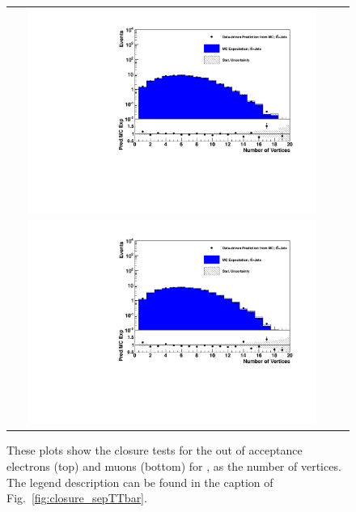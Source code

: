 \begin{figure}[tbhn]
\begin{center}
\begin{tabular}{cc}
\includegraphics[width=0.90\textwidth]{lostlepton/plots/closure/NVttbarAcce.pdf}\\
\includegraphics[width=0.90\textwidth]{lostlepton/plots/closure/NVttbarAccMu.pdf}
\end{tabular}
\end{center}
\caption{These plots show the closure tests for the out of acceptance electrons (top) and muons (bottom) for \ttbar, as the number of vertices. The legend description can be found in the caption of Fig.~\ref{fig:closure_sepTTbar}.}
\label{fig:pileup_acc}
\end{figure}

\cleardoublepage